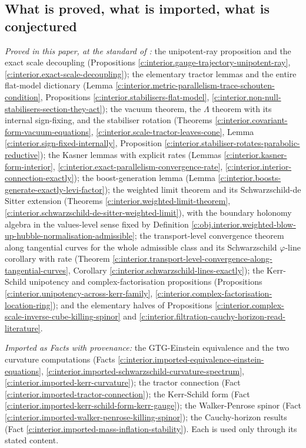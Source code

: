 \documentclass[11pt]{article}
\theoremstyle{definition}
\theoremstyle{plain}
\begin{document}
\subsection*{What is proved, what is imported, what is conjectured}
\label{c:note.interior.setting-what-proved-what-imported-what}
\emph{Proved in this paper, at the standard of \cite{ButlerT1}:} the unipotent-ray proposition and the exact scale decoupling (Propositions \ref{c:interior.gauge-trajectory-unipotent-ray}, \ref{c:interior.exact-scale-decoupling}); the elementary tractor lemmas and the entire flat-model dictionary (Lemma \ref{c:interior.metric-parallelism-trace-schouten-condition}, Propositions \ref{c:interior.stabilisers-flat-model}, \ref{c:interior.non-null-stabilisers-section-they-act}); the vacuum theorem, the $\Lambda$ theorem with its internal sign-fixing, and the stabiliser rotation (Theorems \ref{c:interior.covariant-form-vacuum-equations}, \ref{c:interior.scale-tractor-leaves-cone}, Lemma \ref{c:interior.sign-fixed-internally}, Proposition \ref{c:interior.stabiliser-rotates-parabolic-reductive}); the Kasner lemmas with explicit rates (Lemmas \ref{c:interior.kasner-form-interior}, \ref{c:interior.exact-parallelism-convergence-rate}, \ref{c:interior.interior-connection-exactly}); the boost-generation lemma (Lemma \ref{c:interior.boosts-generate-exactly-levi-factor}); the weighted limit theorem and its Schwarzschild-de Sitter extension (Theorems \ref{c:interior.weighted-limit-theorem}, \ref{c:interior.schwarzschild-de-sitter-weighted-limit}), with the boundary holonomy algebra in the values-level sense fixed by Definition \ref{c:obj.interior.weighted-blow-up-hubble-normalisation-admissible}; the transport-level convergence theorem along tangential curves for the whole admissible class and its Schwarzschild $\varphi$-line corollary with rate (Theorem \ref{c:interior.transport-level-convergence-along-tangential-curves}, Corollary \ref{c:interior.schwarzschild-lines-exactly}); the Kerr-Schild unipotency and complex-factorisation propositions (Propositions \ref{c:interior.unipotency-across-kerr-family}, \ref{c:interior.complex-factorisation-location-ring}); and the elementary halves of Propositions \ref{c:interior.complex-scale-inverse-cube-killing-spinor} and \ref{c:interior.filtration-cauchy-horizon-read-literature}.

\emph{Imported as Facts with provenance:} the GTG-Einstein equivalence and the two curvature computations (Facts \ref{c:interior.imported-equivalence-einstein-equations}, \ref{c:interior.imported-schwarzschild-curvature-spectrum}, \ref{c:interior.imported-kerr-curvature}); the tractor connection (Fact \ref{c:interior.imported-tractor-connection}); the Kerr-Schild form (Fact \ref{c:interior.imported-kerr-schild-form-kerr-gauge}); the Walker-Penrose spinor (Fact \ref{c:interior.imported-walker-penrose-killing-spinor}); the Cauchy-horizon results (Fact \ref{c:interior.imported-mass-inflation-stability}). Each is used only through its stated content.
\end{document}
